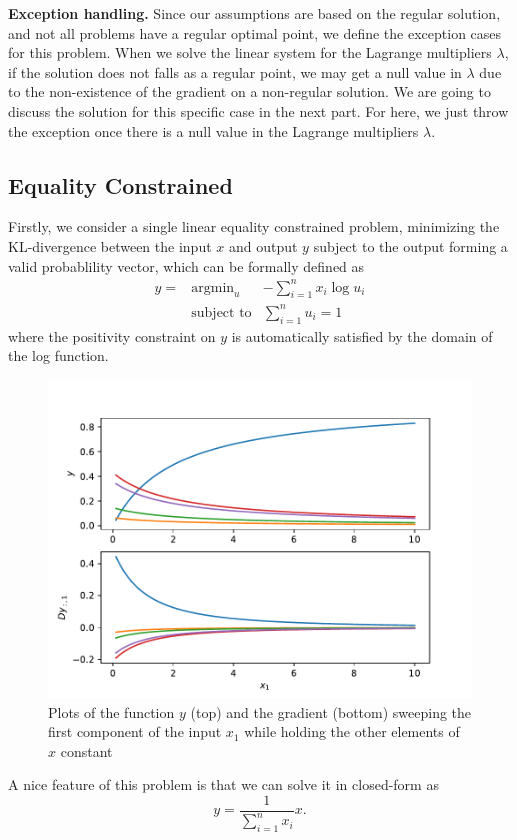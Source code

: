 \par \textbf{Exception handling.}
Since our assumptions are based on the regular solution, and not all problems have a regular optimal point, we define the exception cases for this problem. When we solve the linear system for the Lagrange multipliers $\lambda$, if the solution does not falls as a regular point, we may get a null value in $\lambda$ due to the non-existence of the gradient on a non-regular solution. We are going to discuss the solution for this specific case in the next part. For here, we just throw the exception once there is a null value in the Lagrange multipliers $\lambda$. 

\subsection{Equality Constrained}
Firstly, we consider a single linear equality constrained problem, minimizing the KL-divergence between the input $x$ and output $y$ subject to the output forming a valid probablility vector, which can be formally defined as 
\begin{equation}
    \begin{array}{rll}
        y =& \text{argmin}_u & - \sum_{i=1}^{n} x_i \log u_i \\
        & \text{subject to} & \sum_{i=1}^{n} u_i = 1
    \end{array}
\end{equation}
where the positivity constraint on $y$ is automatically satisfied by the domain of the log function.
\begin{figure}[t]
    \label{fig:equ-lin-eg}
    \centering
    \includegraphics[page=1,width=.8\textwidth]{figs/linear_equality_example.pdf} 
    \caption{Plots of the function $y$ (top) and the gradient (bottom) sweeping the first component of the input $x_1$ while holding the other elements of $x$ constant}
\end{figure}
\par A nice feature of this problem is that we can solve it in closed-form as
$$
y = \frac{1}{\sum_{i=1}^{n} x_i} x.
$$

